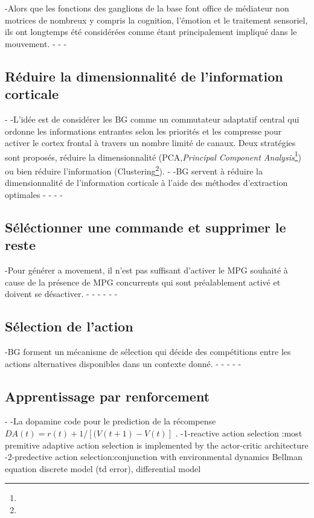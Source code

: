 -Alors que les fonctions des ganglions de la base font office de médiateur non motrices de nombreux y compris la cognition, l'émotion et le traitement sensoriel, ils ont longtemps été considérées comme étant principalement impliqué dans le mouvement.
-
-%
-\subsection{Réduire la dimensionnalité de l'information corticale}
-
-L'idée est de considérer les BG comme un commutateur adaptatif central qui ordonne les informations entrantes selon les priorités et les compresse pour activer le cortex frontal à travers un nombre limité de canaux. Deux stratégies sont proposés, réduire la dimensionnalité (PCA,\textit{Principal Component Analysis}\footnote{}) ou bien réduire l'information (Clustering\footnote{}).\citep{Bar-gad extraction methods}
-
-BG servent  à réduire la dimensionnalité de l'information corticale à l'aide des méthodes d'extraction optimales
-
-%
-
-\subsection{Séléctionner une commande et supprimer le reste}
-Pour générer a movement, il n'est pas suffisant d'activer le MPG souhaité  à cause de la présence de MPG concurrents qui sont préalablement activé et doivent se désactiver.
-\citep{C.Oreilly J.Frank}
-
-
-%
-
-\subsection{Sélection de l'action}
-BG forment un mécanisme de sélection qui décide des compétitions entre les actions alternatives disponibles dans un contexte donné.
-\citep{Gurney,redgrave,Mchaffie}
-
-%
-
-\subsection{Apprentissage par renforcement}
-
-\citep{Doya 1999}La dopamine code pour le prediction de la récompense $DA(t)=r(t)+1/[(V(t+1)-V(t)]$ \citep{Schultz 1997}.
-1-reactive action selection :most premitive adaptive action selection is implemented by the actor-critic architecture \citep{Barto, anderson 1983}
-2-predective action selection:conjunction with environmental dynamics Bellman equation discrete model (td error), differential model 
